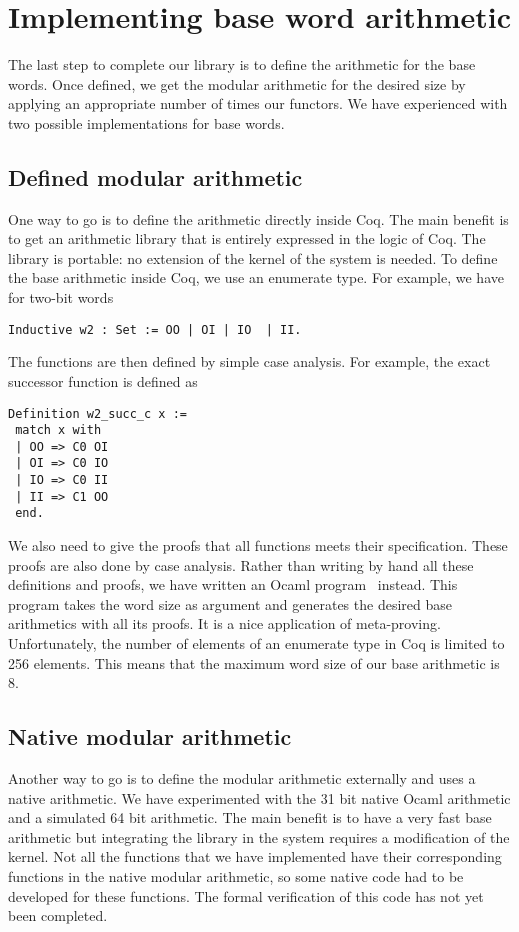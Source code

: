 \section{Implementing base word arithmetic \label{word}}

The last step to complete our library is to define the arithmetic for the base words. 
Once defined,  we get the modular arithmetic for the desired size by applying an appropriate
number of times our functors. 
We have experienced with two possible implementations for base words.

\subsection{Defined modular arithmetic}

One way to go is to define the arithmetic directly inside {\sc Coq}.
The main benefit is to get an arithmetic library that is entirely expressed 
in the logic of {\sc Coq}. The library is portable: no extension of the kernel 
of the system is needed. To define the base arithmetic inside {\sc Coq}, 
we use an enumerate type. For example, we have for two-bit words
\begin{verbatim}
Inductive w2 : Set := OO | OI | IO  | II.
\end{verbatim}
The functions are then defined by simple case analysis. For example,
the exact successor function is defined as
\begin{verbatim}
Definition w2_succ_c x :=
 match x with
 | OO => C0 OI
 | OI => C0 IO
 | IO => C0 II
 | II => C1 OO
 end.
\end{verbatim}
We also need to give the proofs that all functions meets their specification.
These proofs are also done by case analysis. 
Rather than writing by hand all these definitions and proofs, we have
written an {\sc Ocaml} program~\cite{ocaml} instead. This program takes the word
size as argument and generates the desired base arithmetics with all
its proofs. It is a nice application of meta-proving. Unfortunately, the
number of elements of an enumerate type in {\sc Coq} is limited to 
256 elements. This means that the maximum word size of our base arithmetic
is 8.

\subsection{Native modular arithmetic}

Another way to go is to define the modular arithmetic externally and
uses a native arithmetic. We have experimented with the 31 bit native
{\sc Ocaml} arithmetic and a simulated 64 bit arithmetic. The main benefit
is to have a very fast base arithmetic but integrating the library in the
system requires a modification of the kernel. Not all the functions that
we have implemented have their corresponding functions in the native modular
arithmetic, so some native code had to be developed for these functions.
The formal verification of this code has not yet been completed.